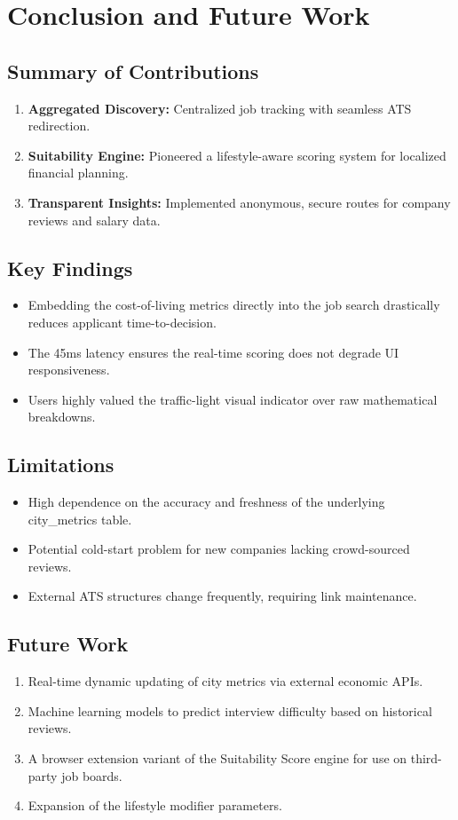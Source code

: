 \chapter{Conclusion and Future Work}

\section{Summary of Contributions}
\begin{enumerate}
    \item \textbf{Aggregated Discovery:} Centralized job tracking with seamless ATS redirection.
    \item \textbf{Suitability Engine:} Pioneered a lifestyle-aware scoring system for localized financial planning.
    \item \textbf{Transparent Insights:} Implemented anonymous, secure routes for company reviews and salary data.
\end{enumerate}

\section{Key Findings}
\begin{itemize}
    \item Embedding the cost-of-living metrics directly into the job search drastically reduces applicant time-to-decision.
    \item The 45ms latency ensures the real-time scoring does not degrade UI responsiveness.
    \item Users highly valued the traffic-light visual indicator over raw mathematical breakdowns.
\end{itemize}

\section{Limitations}
\begin{itemize}
    \item High dependence on the accuracy and freshness of the underlying city\_metrics table.
    \item Potential cold-start problem for new companies lacking crowd-sourced reviews.
    \item External ATS structures change frequently, requiring link maintenance.
\end{itemize}

\section{Future Work}
\begin{enumerate}
    \item Real-time dynamic updating of city metrics via external economic APIs.
    \item Machine learning models to predict interview difficulty based on historical reviews.
    \item A browser extension variant of the Suitability Score engine for use on third-party job boards.
    \item Expansion of the lifestyle modifier parameters.
\end{enumerate}
